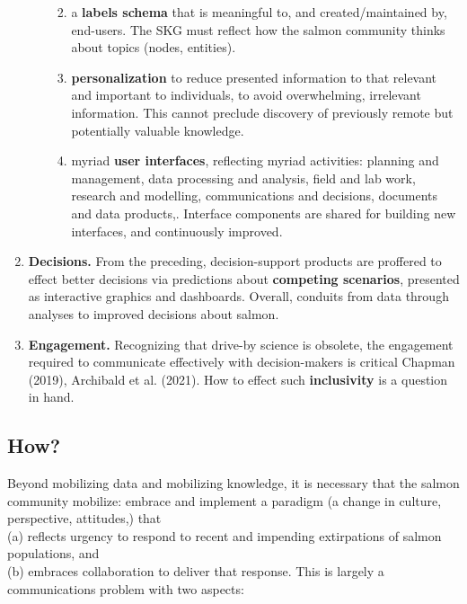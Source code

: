 \documentclass[
]{agujournal2019}
\begin{document}
\begin{enumerate}
\begin{enumerate}
    \begin{enumerate}
    \def\labelenumiii{\roman{enumiii}.}
    \item
      a \textbf{labels schema} that is meaningful to, and
      created/maintained by, end-users. The SKG must reflect how the
      salmon community thinks about topics (nodes, entities).
    \item
      \textbf{personalization} to reduce presented information to that
      relevant and important to individuals, to avoid overwhelming,
      irrelevant information. This cannot preclude discovery of
      previously remote but potentially valuable knowledge.
    \item
      myriad \textbf{user interfaces}, reflecting myriad activities:
      planning and management, data processing and analysis, field and
      lab work, research and modelling, communications and decisions,
      documents and data products,. Interface components are shared for
      building new interfaces, and continuously improved.
    \end{enumerate}
  \end{enumerate}
\item
  \textbf{Decisions.} From the preceding, decision-support products are
  proffered to effect better decisions via predictions about
  \textbf{competing scenarios}, presented as interactive graphics and
  dashboards. Overall, conduits from data through analyses to improved
  decisions about salmon.
\item
  \textbf{Engagement.} Recognizing that drive-by science is obsolete,
  the engagement required to communicate effectively with
  decision-makers is critical Chapman (2019), Archibald et al. (2021).
  How to effect such \textbf{inclusivity} is a question in hand.
\end{enumerate}

\subsection{How?}\label{how}

Beyond mobilizing data and mobilizing knowledge, it is necessary that
the salmon community mobilize: embrace and implement a paradigm (a
change in culture, perspective, attitudes,) that\\
(a) reflects urgency to respond to recent and impending extirpations of
salmon populations, and\\
(b) embraces collaboration to deliver that response. This is largely a
communications problem with two aspects:
\end{document}
